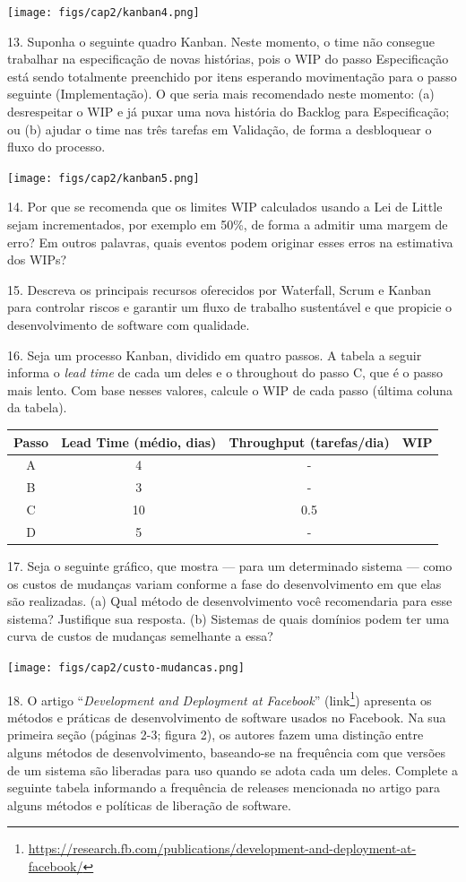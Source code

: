 \documentclass[
  11pt,
  twoside]{book}
\DeclareRobustCommand{\href}[2]{#2\footnote{\url{#1}}}
\begin{document}
\texttt{[image: figs/cap2/kanban4.png]}

13. Suponha o seguinte quadro Kanban. Neste momento, o time não consegue
trabalhar na especificação de novas histórias, pois o WIP do passo
Especificação está sendo totalmente preenchido por itens esperando
movimentação para o passo seguinte (Implementação). O que seria mais
recomendado neste momento: (a) desrespeitar o WIP e já puxar uma nova
história do Backlog para Especificação; ou (b) ajudar o time nas três
tarefas em Validação, de forma a desbloquear o fluxo do processo.

\texttt{[image: figs/cap2/kanban5.png]}

14. Por que se recomenda que os limites WIP calculados usando a Lei de
Little sejam incrementados, por exemplo em 50\%, de forma a admitir uma
margem de erro? Em outros palavras, quais eventos podem originar esses
erros na estimativa dos WIPs?

15. Descreva os principais recursos oferecidos por Waterfall, Scrum e
Kanban para controlar riscos e garantir um fluxo de trabalho sustentável
e que propicie o desenvolvimento de software com qualidade.

16. Seja um processo Kanban, dividido em quatro passos. A tabela a
seguir informa o \emph{lead time} de cada um deles e o throughout do
passo C, que é o passo mais lento. Com base nesses valores, calcule o
WIP de cada passo (última coluna da tabela).

\begin{longtable}[]{@{}cccc@{}}
\toprule
\textbf{Passo} & \textbf{Lead Time} (médio, dias) & \textbf{Throughput}
(tarefas/dia) & \textbf{WIP}\tabularnewline
\midrule
\endhead
A & 4 & - &\tabularnewline
B & 3 & - &\tabularnewline
C & 10 & 0.5 &\tabularnewline
D & 5 & - &\tabularnewline
\bottomrule
\end{longtable}

17. Seja o seguinte gráfico, que mostra --- para um determinado sistema
--- como os custos de mudanças variam conforme a fase do desenvolvimento
em que elas são realizadas. (a) Qual método de desenvolvimento você
recomendaria para esse sistema? Justifique sua resposta. (b) Sistemas de
quais domínios podem ter uma curva de custos de mudanças semelhante a
essa?

\texttt{[image: figs/cap2/custo-mudancas.png]}

18. O artigo ``\emph{Development and Deployment at Facebook}''
(\href{https://research.fb.com/publications/development-and-deployment-at-facebook/}{link})
apresenta os métodos e práticas de desenvolvimento de software
 usados no Facebook. Na sua primeira seção (páginas 2-3;
figura 2), os autores fazem uma distinção entre alguns métodos de
desenvolvimento, baseando-se na frequência com que versões de um sistema
são liberadas para uso quando se adota cada um deles. Complete a
seguinte tabela informando a frequência de releases mencionada no artigo
para alguns métodos e políticas de liberação de software.
\end{document}
